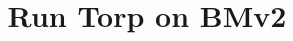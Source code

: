 \documentclass[10pt,sigconf,letterpaper]{acmart}
\theoremstyle{plain}
\theoremstyle{definition}
\theoremstyle{remark}
\begin{document}
\title[]{Run Torp on BMv2}

\renewcommand{\shortauthors}{}

\maketitle



\end{document}
